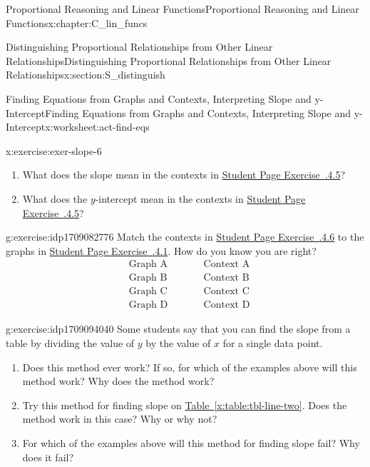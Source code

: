 \documentclass[oneside,10pt,]{book}
\newcommand{\xreffont}{\relax}
\numberwithin{equation}{chapter}
\newcommand{\amp}{&}
\begin{document}
\begin{chapterptx}{Proportional Reasoning and Linear Functions}{}{Proportional Reasoning and Linear Functions}{}{}{x:chapter:C_lin_funcs}
\begin{sectionptx}{Distinguishing Proportional Relationships from Other Linear Relationships}{}{Distinguishing Proportional Relationships from Other Linear Relationships}{}{}{x:section:S_distinguish}
\begin{worksheet-subsection}{Finding Equations from Graphs and Contexts, Interpreting Slope and y-Intercept}{}{Finding Equations from Graphs and Contexts, Interpreting Slope and y-Intercept}{}{}{x:worksheet:act-find-eqs}
\begin{divisionexercise}{6}{}{}{x:exercise:exer-slope-6}
\begin{enumerate}[font=\bfseries,label=(\alph*),ref=\alph*]
\item{}What does the slope mean in the contexts in \hyperlink{x:exercise:exer-slope-contexts}{Student Page Exercise~{\xreffont 2.6.4.5}}?%
\item{}What does the \(y\)-intercept mean in the contexts in \hyperlink{x:exercise:exer-slope-contexts}{Student Page Exercise~{\xreffont 2.6.4.5}}?%
\end{enumerate}
\end{divisionexercise}%
\begin{divisionexercise}{7}{}{}{g:exercise:idp1709082776}%
Match the contexts in \hyperlink{x:exercise:exer-slope-6}{Student Page Exercise~{\xreffont 2.6.4.6}} to the graphs in \hyperlink{x:exercise:exer-eq-1}{Student Page Exercise~{\xreffont 2.6.4.1}}. How do you know you are right?%
\begin{align*}
\amp \text{Graph A} \amp \qquad \amp \text{Context A}\\
\amp \text{Graph B} \amp \qquad \amp \text{Context B}\\
\amp \text{Graph C} \amp \qquad \amp \text{Context C}\\
\amp \text{Graph D} \amp \qquad \amp \text{Context D}
\end{align*}
%
\end{divisionexercise}%
\begin{divisionexercise}{8}{}{}{g:exercise:idp1709094040}%
Some students say that you can find the slope from a table by dividing the value of \(y\) by the value of \(x\) for a single data point.%
\begin{enumerate}[font=\bfseries,label=(\alph*),ref=\alph*]
\item{}Does this method ever work? If so, for which of the examples above will this method work? Why does the method work?%
\item{}Try this method for finding slope on \hyperref[x:table:tbl-line-two]{Table~{\xreffont\ref{x:table:tbl-line-two}}}. Does the method work in this case? Why or why not?%
\item{}For which of the examples above will this method for finding slope fail? Why does it fail?%
\end{enumerate}
\end{divisionexercise}%
\end{worksheet-subsection}
\restoregeometry
%
%
\typeout{************************************************}
\typeout{************************************************}
%

\end{sectionptx}
\end{chapterptx}
\end{document}
